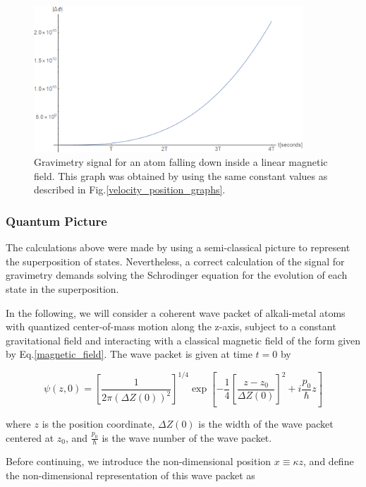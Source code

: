 \documentclass{article}
\begin{document}
\begin{figure}
\centering
\includegraphics[width=0.9\textwidth]{fase.png}
\caption{Gravimetry signal for an atom falling down inside a linear magnetic field. This graph was obtained by using the same constant values as described in Fig.\ref{velocity_position_graphs}.}
\label{phase_graph}
\end{figure}

\subsubsection{Quantum Picture}
The calculations above were made by using a semi-classical picture to represent the superposition of states. Nevertheless, a correct calculation of the signal for gravimetry demands solving the Schrodinger equation for the evolution of each state in the superposition. 

In the following, we will consider a coherent wave packet of alkali-metal atoms with quantized center-of-mass motion along the z-axis, subject to a constant gravitational field and interacting with a classical magnetic field of the form given by Eq.\ref{magnetic_field}. The wave packet is given at time $t=0$ by

\begin{equation}\label{wave_packet}
\psi(z,0) = 
\left[\frac{1}{2 \pi (\Delta Z(0))^2} \right]^{1/4} \exp \left[-\frac{1}{4} \left[\frac{z-z_{0}}{\Delta Z(0)}\right]^{2}  + i \frac{p_{0}}{\hbar}z \right]
\end{equation}

where $z$ is the position coordinate, $\Delta Z(0)$ is the width of the wave packet centered at $z_{0}$, and $\frac{p_{0}}{\hbar}$ is the wave number of the wave packet. 

Before continuing, we introduce the non-dimensional position $x \equiv \kappa z$, and define the non-dimensional representation of this wave packet as
\end{document}
